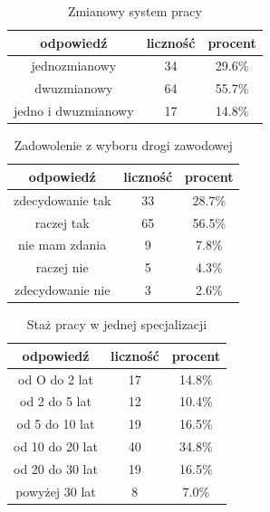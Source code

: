 \documentclass[a4paper,12pt,twoside,openany]{report}
\begin{document}
\begin{table}[h]
\caption{Zmianowy system pracy}
\centering
\begin{tabular}{ | c | c | c |}
\hline
odpowiedź & liczność & procent\\
\hline
jednozmianowy  &  34  & 29.6\% \\
\hline
dwuzmianowy  &  64  & 55.7\% \\
\hline
jedno i dwuzmianowy  &  17  & 14.8\% \\
\hline
\end{tabular}
\label{tab:Q4}
\end{table}



\begin{table}[h]
\caption{Zadowolenie z wyboru drogi zawodowej}
\centering
\begin{tabular}{ | c | c | c |}
\hline
odpowiedź & liczność & procent\\
\hline
zdecydowanie tak  &  33  & 28.7\% \\
\hline
raczej tak  &  65  & 56.5\% \\
\hline
nie mam zdania  &  9  & 7.8\% \\
\hline
raczej nie  &  5  & 4.3\% \\
\hline
zdecydowanie nie  &  3  & 2.6\% \\
\hline
\end{tabular}
\label{tab:Q5}
\end{table}



\begin{table}[h]
\caption{Staż pracy w jednej specjalizacji}
\centering
\begin{tabular}{ | c | c | c |}
\hline
odpowiedź & liczność & procent\\
\hline
od O do 2 lat  &  17  & 14.8\% \\
\hline
od 2 do 5 lat  &  12  & 10.4\% \\
\hline
od 5 do 10 lat  &  19  & 16.5\% \\
\hline
od 10 do 20 lat  &  40  & 34.8\% \\
\hline
od 20 do 30 lat  &  19  & 16.5\% \\
\hline
powyżej 30 lat  &  8  & 7.0\% \\
\hline
\end{tabular}
\label{tab:Q6}
\end{table}
\end{document}

